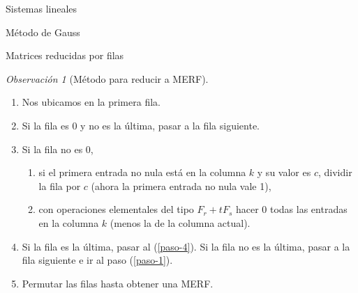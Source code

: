 \documentclass[a4paper,12pt,twoside,spanish,reqno]{amsbook}
\theoremstyle{definition}
\theoremstyle{remark}
\newtheorem{observacion}{Observaci\'on}[section]
\begin{document}
\begin{chapter}{Sistemas lineales}
\begin{section}{Método de Gauss }
\begin{subsection}{Matrices reducidas por filas}
\begin{observacion}[\sc Método para reducir a MERF]
                \begin{enumerate}
                    \item \label{paso-0} Nos ubicamos en la primera fila.
                    \item \label{paso-1} Si la fila es 0 y no es la última, pasar a la fila siguiente.
                    \item \label{paso-2} Si la fila no es 0, 
                    \begin{enumerate}
                        \item si el primera entrada no nula está en  la columna $k$ y su valor es $c$, dividir la fila por $c$ (ahora la primera entrada no nula vale 1),
                        \item con operaciones elementales del tipo $F_r+ tF_s$ hacer 0  todas las entradas en la columna $k$ (menos la de la columna actual).    
                    \end{enumerate}
                    \item \label{paso-3} Si la fila es la última, pasar al (\ref{paso-4}). Si la fila no es la última, pasar a la fila siguiente e ir al paso (\ref{paso-1}).  
                    \item \label{paso-4} Permutar las filas hasta obtener una MERF. 
                \end{enumerate}
            \end{observacion}
                

\end{subsection}
\end{section}
\end{chapter}
\end{document}
